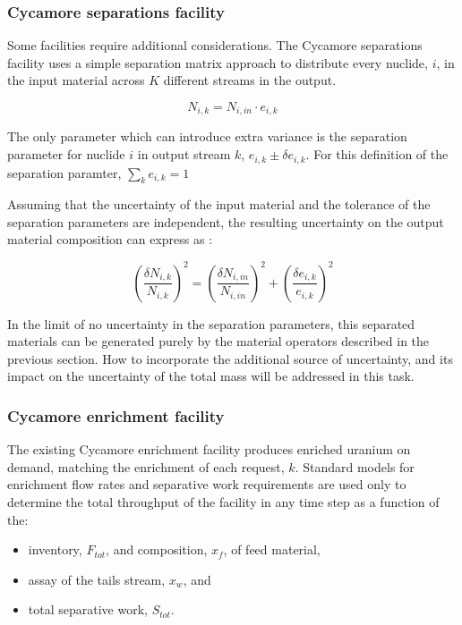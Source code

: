 \documentclass[dvips,12pt]{article}
\newcommand{\unc}[1]
{ \delta #1 }
\newcommand{\uncratio}[1]
{ \left(\frac{\unc{#1}}{#1}\right) }
\newcommand{\uncratiosq}[1]
{ \uncratio{#1}^2 }
\begin{document}
\subsubsection{Cycamore separations facility}

Some facilities require additional considerations.
The Cycamore separations facility uses a simple
separation matrix approach to distribute every
nuclide, $i$, in the input material across $K$
different streams in the output.

\begin{equation}
N_{i,k} = N_{i,in} \cdot e_{i,k}
\end{equation}

The only parameter which can introduce extra
variance is the separation parameter for nuclide
$i$ in output stream $k$, $e_{i,k} \pm \delta
e_{i,k}$.  For this definition of the separation
paramter, $\sum_k e_{i,k} = 1$

Assuming that the uncertainty of the input
material and the tolerance of the separation
parameters are independent, the resulting
uncertainty on the output material composition can
express as :

\begin{equation}
  \uncratiosq{N_{i,k}} = \uncratiosq{N_{i,in}} +  \uncratiosq{e_{i,k}}
\end{equation}

In the limit of no uncertainty in the separation
parameters, this separated materials can be
generated purely by the material operators
described in the previous section.  How to
incorporate the additional source of uncertainty,
and its impact on the uncertainty of the total
mass will be addressed in this task.

\subsubsection{Cycamore enrichment facility}

The existing Cycamore enrichment facility produces
enriched uranium on demand, matching the
enrichment of each request, $k$.  Standard models
for enrichment flow rates and separative work
requirements are used only to determine the total
throughput of the facility in any time step as a
function of the:
\begin{itemize}
\item inventory, $F_{tot}$, and composition,
  $x_f$, of feed material,
\item assay of the tails stream, $x_w$, and
\item total separative work, $S_{tot}$.
\end{itemize}
\end{document}
